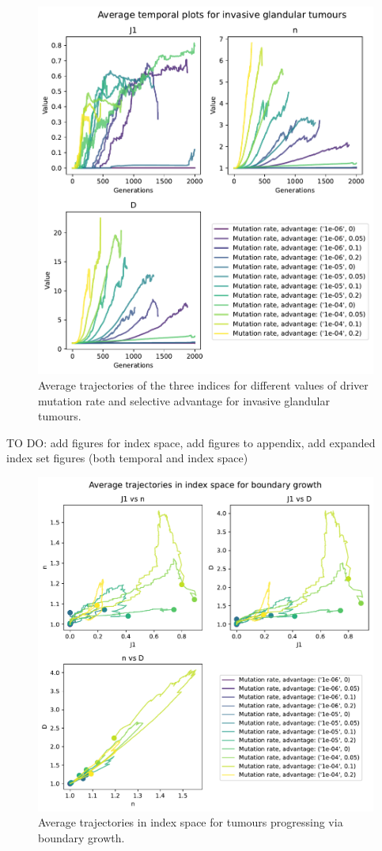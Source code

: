 \begin{figure}
    \centering
    \includegraphics[width=\textwidth]{Chapter_3/figures/inv-gland-temporal.pdf}
    \caption{Average trajectories of the three indices for different values of driver mutation rate and selective advantage for invasive glandular tumours.}
    \label{fig:inv-gland-temporal}
\end{figure}
TO DO: add figures for index space, add figures to appendix, add expanded index set figures (both temporal and index space)
\begin{figure}
    \centering
    \includegraphics[width=\textwidth]{Chapter_3/figures/indspace-boundary.pdf}
    \caption{Average trajectories in index space for tumours progressing via boundary growth.}
    \label{fig:boundary-indspace}
\end{figure}
